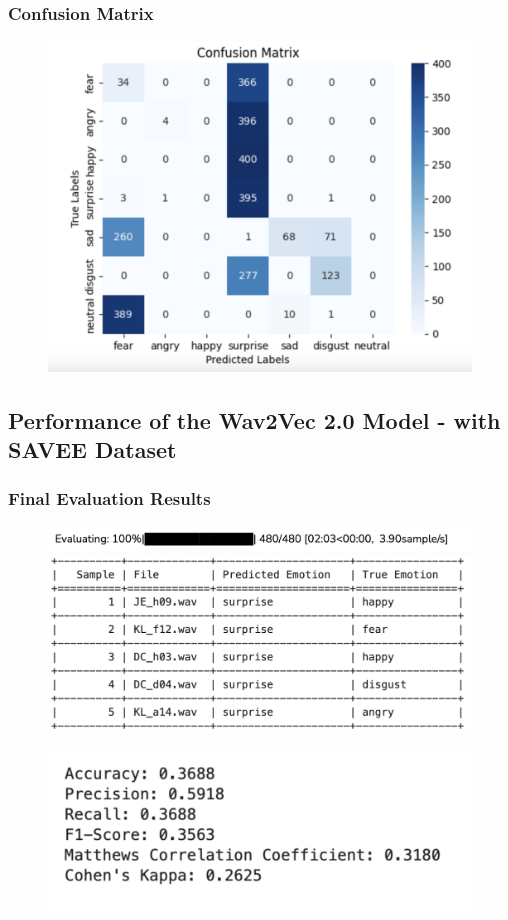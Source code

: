 \documentclass[a4paper,12pt]{article}
\begin{document}
\subsubsection{Confusion Matrix}
\begin{figure}[H]
    \centering
    \includegraphics[width=1\linewidth]{5325.png}
\end{figure}
\newpage
\subsection{Performance of the Wav2Vec 2.0 Model - with SAVEE Dataset}
\subsubsection{Final Evaluation Results}
\begin{figure}[H]
    \centering
    \includegraphics[width=1\linewidth]{5411.png}
    \includegraphics[width=1\linewidth]{5412.png}
\end{figure}
\begin{figure}[H]
    \centering
    \includegraphics[width=1\linewidth]{5413.png}
\end{figure}
\end{document}
